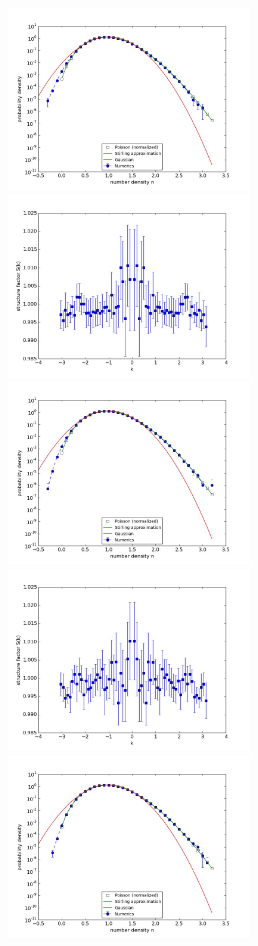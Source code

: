 \documentclass{article}
\begin{document}
\begin{figure}
\begin{center}
\end{center}
\includegraphics[width=0.5\linewidth,height=1.9in]{fig1/react_dt0.25_hist_mid1.jpg}
\includegraphics[width=0.5\linewidth,height=1.9in]{fig1/react_dt0.25_Sk_mid1.jpg}
\includegraphics[width=0.5\linewidth,height=1.9in]{fig1/react_dt0.25_hist_mid2.jpg}
\includegraphics[width=0.5\linewidth,height=1.9in]{fig1/react_dt0.25_Sk_mid2.jpg}
\includegraphics[width=0.5\linewidth,height=1.9in]{fig1/react_dt0.25_hist_mid3.jpg}

\end{figure}
\end{document}
